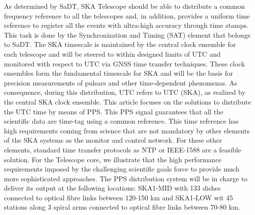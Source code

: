 As determined by SaDT, SKA Telescope should be able to distribute a common frequency reference to all the telescopes and, in addition, provides a uniform time reference to register all the events with ultra-high accuracy through time stamps. This task is done by the Synchronization and Timing (SAT) element that belongs to SaDT. The SKA timescale is maintained by the central clock ensemble for each telescope and will be steered to within designed limits of UTC and monitored with respect to UTC via GNSS time transfer techniques. These clock ensembles form the fundamental timescale for SKA and will be the basis for precision measurements of pulsars and other time-dependent phenomenas. As consequence, during this distribution, UTC refers to UTC (SKA), as realized by the central SKA clock ensemble.
This article focuses on the solutions to distribute the UTC time by means of PPS. This PPS signal guarantees that all the scientific data are time-tag using a common reference. This time reference has high requirements coming from science that are not mandatory by other elements of the SKA systems as the monitor and control network. For these other elements, standard time transfer protocols as NTP or IEEE-1588 are a feasible solution. For the Telescope core, we illustrate that the high performance requirements imposed by the challenging scientific goals force to provide much more sophisticated approaches. 
The PPS distribution system will be in charge to deliver its output at the following locations: SKA1-MID with 133 dishes connected to optical fibre links between 120-150 km and SKA1-LOW wit 45 stations along 3 spiral arms connected to optical fibre links between 70-80 km.

